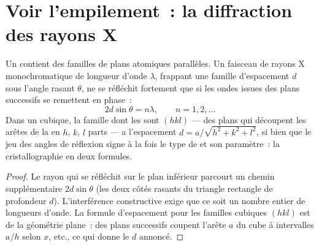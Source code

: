 \section{Voir l'empilement~: la diffraction des rayons X}

\begin{proposition}\label{prop:b3:crystalline-solids:bragg}
Un  contient des familles de plans atomiques parallèles. Un
faisceau de rayons X monochromatique de longueur d'onde $\lambda$,
frappant une famille d'espacement $d$ sous l'angle rasant $\theta$, ne
se réfléchit fortement que si les ondes issues des plans successifs
se remettent en phase~:
\[
2d\sin\theta = n\lambda , \qquad n = 1, 2, \dots
\]
Dans un  cubique, la famille dont les \emph{}
sont $(hkl)$ --- des plans qui découpent les arêtes de la  en
$h$, $k$, $l$ parts --- a l'espacement
$d = a/\sqrt{h^2 + k^2 + l^2}$, si bien que le jeu des angles de
réflexion signe à la fois le type de  et son paramètre~: la
cristallographie en deux formules.
\end{proposition}

\begin{proof}
Le rayon qui se réfléchit sur le plan inférieur parcourt un chemin
supplémentaire $2d
\sin\theta$ (les deux côtés rasants du triangle rectangle de
profondeur $d$). L'interférence constructive exige que ce soit un
nombre entier de longueurs d'onde. La formule d'espacement pour les
familles cubiques $(hkl)$ est de la géométrie plane~: des plans
successifs coupent l'arête $a$ du cube à intervalles $a/h$ selon $x$,
etc., ce qui donne le $d$ annoncé.
\end{proof}


